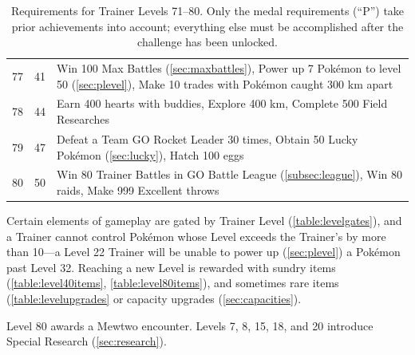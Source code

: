 \begin{table}
\begin{tabular}{rrp{}}
\rowcolor{Gray!25}
  77 & 41 & Win 100 Max Battles (\autoref{sec:maxbattles}),\newline
  Power up 7 Pokémon to level 50 (\autoref{sec:plevel}),\newline
  Make 10 trades with Pokémon caught 300 km apart\\
  78 & 44 & Earn 400 hearts with buddies,\newline
  Explore 400 km,\newline
  Complete 500 Field Researches\\
\rowcolor{Gray!25}
  79 & 47 & Defeat a Team GO Rocket Leader 30 times,\newline
  Obtain 50 Lucky Pokémon (\autoref{sec:lucky}),\newline
  Hatch 100 eggs\\
  80 & 50 & Win 80 Trainer Battles in GO Battle League (\autoref{subsec:league}),\newline
  Win 80 raids,\newline
  Make 999 Excellent throws\\
\end{tabular}
\caption[Requirements for Trainer Levels 71--80]{Requirements for Trainer Levels 71--80.
   Only the medal requirements (``P'') take prior achievements into account; everything else
   must be accomplished after the challenge has been unlocked.\label{table:xp71plus}}
\end{table}
Certain elements of gameplay are gated by Trainer Level (\autoref{table:levelgates}),
  and a Trainer cannot control Pokémon whose Level exceeds the Trainer's
  by more than 10---a Level 22 Trainer will be unable to power up (\autoref{sec:plevel}) a Pokémon past Level 32.
Reaching a new Level is rewarded with sundry items (\autoref{table:level40items}, \autoref{table:level80items}),
 and sometimes rare items (\autoref{table:levelupgrades} or capacity upgrades (\autoref{sec:capacities}).

Level 80 awards a Mewtwo encounter.
Levels 7, 8, 15, 18, and 20 introduce Special Research (\autoref{sec:research}).
